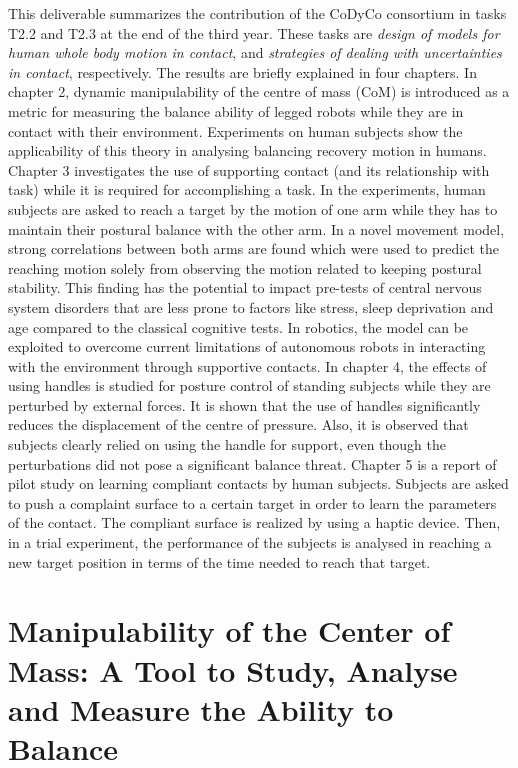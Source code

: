 \documentclass[12pt,a4paper,twoside]{report}
\begin{document}
This deliverable summarizes the contribution of the CoDyCo consortium in tasks
T2.2 and T2.3 at the end of the third year.  These tasks are \textit{design of
  models for human whole body motion in contact}, and \textit{strategies of
  dealing with uncertainties in contact}, respectively.  The results are
briefly explained in four chapters.  In chapter 2, dynamic manipulability of
the centre of mass (CoM) is introduced as a metric for measuring the balance
ability of legged robots while they are in contact with their environment.
Experiments on human subjects show the applicability of this theory in
analysing balancing recovery motion in humans.  Chapter 3 investigates the use
of supporting contact (and its relationship with task) while it is required
for accomplishing a task.  In the experiments, human subjects are asked to
reach a target by the motion of one arm while they has to maintain their
postural balance with the other arm.  In a novel movement model, strong
correlations between both arms are found which were used to predict the
reaching motion solely from observing the motion related to keeping postural
stability. This finding has the potential to impact pre-tests of central
nervous system disorders that are less prone to factors like stress, sleep
deprivation and age compared to the classical cognitive tests.  In robotics,
the model can be exploited to overcome current limitations of autonomous
robots in interacting with the environment through supportive contacts.  In
chapter 4, the effects of using handles is studied for posture control of
standing subjects while they are perturbed by external forces.  It is shown
that the use of handles significantly reduces the displacement of the centre
of pressure.  Also, it is observed that subjects clearly relied on using the
handle for support, even though the perturbations did not pose a significant
balance threat.  Chapter 5 is a report of pilot study on learning compliant
contacts by human subjects.  Subjects are asked to push a complaint surface to
a certain target in order to learn the parameters of the contact.  The
compliant surface is realized by using a haptic device.  Then, in a trial
experiment, the performance of the subjects is analysed in reaching a new
target position in terms of the time needed to reach that target.



\chapter{Manipulability of the Center of Mass: A Tool to Study, Analyse and Measure the Ability to Balance}\label{sec:Morteza}

\end{document}
